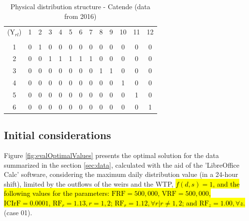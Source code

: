 \documentclass{singlecol}
\theoremstyle{TH}{
\newtheorem{lemma}{Lemma}
\newtheorem{theorem}[lemma]{Theorem}
\newtheorem{corrolary}[lemma]{Corrolary}
\newtheorem{conjecture}[lemma]{Conjecture}
\newtheorem{proposition}[lemma]{Proposition}
\newtheorem{claim}[lemma]{Claim}
\newtheorem{stheorem}[lemma]{Wrong Theorem}
\newtheorem{algorithm}{Algorithm}
}
\theoremstyle{THrm}{
\newtheorem{definition}{Definition}[section]
\newtheorem{question}{Question}[section]
\newtheorem{remark}{Remark}
\newtheorem{scheme}{Scheme}
}
\theoremstyle{THhit}{
\newtheorem{case}{Case}[section]
}
\begin{document}
\begin{table}[H]
\begin{center}
	\begin{tabular}{ c c c c c c c c c c c c c } 

		($\mathrm{Y}_{rl}$)	& 1 & 2 & 3 & 4 & 5 & 6 & 7 & 8 & 9 & 10 & 11 & 12  \\
		                                                                      \\
		1	              	& 0 & 1 & 0 & 0 & 0 & 0 & 0 & 0 & 0 &  0 &  0 &  0  \\
		2                 	& 0 & 0 & 1 & 1 & 1 & 1 & 1 & 0 & 0 &  0 &  0 &  0  \\
		3                 	& 0 & 0 & 0 & 0 & 0 & 0 & 0 & 1 & 1 &  0 &  0 &  0  \\
		4                 	& 0 & 0 & 0 & 0 & 0 & 0 & 0 & 0 & 0 &  1 &  0 &  0  \\
		5                 	& 0 & 0 & 0 & 0 & 0 & 0 & 0 & 0 & 0 &  0 &  1 &  0  \\
	    6                 	& 0 & 0 & 0 & 0 & 0 & 0 & 0 & 0 & 0 &  0 &  0 &  1  \\
	\end{tabular}
\caption{Physical distribution structure - Catende (data from 2016)}
\label{tab:phyDitStr}
\end{center}
\end{table}

\subsection{Initial considerations}
\label{sec:initialConsiderations}

Figure \ref{fig:evalOptimalValues} presents the optimal solution for the data summarized in the section \ref{sec:data}, calculated with the aid of the 'LibreOffice Calc' software, considering the maximum daily distribution value (in a 24-hour shift), limited by the outflows of the weirs and the WTP,  \hl{$f(d,s)=1$, and the following values for the parameters: $\mathrm{FRF}= 500,000$, $\mathrm{VRF}= 500,000$,  $\mathrm{ICIrF} = 0.0001$,  $\mathrm{RF}_r = 1.13, r=1,2$;  $\mathrm{RF}_r = 1.12,  \forall r | r \neq 1,2$; and $\mathrm{RF}_z =1.00, \forall z$.} (case 01). 
\end{document}
